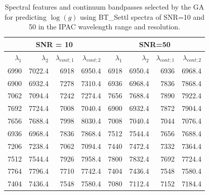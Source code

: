 \begin{table}
\begin{center}
\begin{tabular}{rrrr | rrrr}
  \hline
 \multicolumn{4}{c}{SNR = 10} &  \multicolumn{4}{c}{SNR=50} \\
  \hline
$\lambda_1$ & $\lambda_2$ & $\lambda_{cont;1}$ & $\lambda_{cont;2} $ & $\lambda_1$ & $\lambda_2$ & $\lambda_{cont;1}$ & $\lambda_{cont;2} $ \\ 
  \hline

6990 & 7022.4 &	6918 & 6950.4 & 6918 & 6950.4 & 6936 & 6968.4  \\
6900 & 6932.4 &	7278 & 7310.4 & 6936 & 6968.4 & 7836 & 7868.4  \\
7062 & 7094.4 &	7242 & 7274.4 & 7656 & 7688.4 & 7890 & 7922.4  \\
7692 & 7724.4 &	7008 & 7040.4 & 6900 & 6932.4 & 7872 & 7904.4  \\
7656 & 7688.4 &	7998 & 8030.4 & 7008 & 7040.4 & 7044 & 7076.4  \\
6936 & 6968.4 &	7836 & 7868.4 & 7512 & 7544.4 & 7656 & 7688.4  \\
7206 & 7238.4 &	7062 & 7094.4 & 7440 & 7472.4 & 7332 & 7364.4  \\
7512 & 7544.4 &	7926 & 7958.4 & 7800 & 7832.4 & 7692 & 7724.4  \\
7764 & 7796.4 &	7710 & 7742.4 & 7404 & 7436.4 & 7548 & 7580.4  \\
7404 & 7436.4 &	7548 & 7580.4 & 7080 & 7112.4 & 7152 & 7184.4  \\
   \hline
\end{tabular}
\caption {Spectral features and continuum bandpasses selected by the
  GA for predicting $\log(g)$ using BT\_Settl spectra of SNR=10 and 50
  in the IPAC wavelength range and
  resolution.} \label{tab:ipac-logg-noisy}
\end{center}
\end{table}


